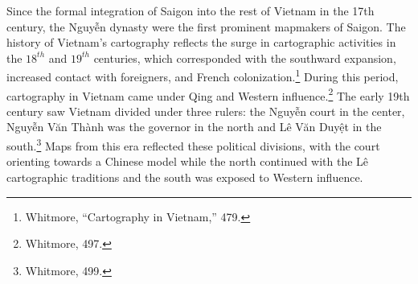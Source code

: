 \en
\begin{figure}[!ht]
\end{figure}

Since the formal integration of Saigon into the rest of Vietnam in the 17th century, the \vi Nguyễn dynasty were the first prominent mapmakers of Saigon. The history of Vietnam’s cartography reflects the surge in cartographic activities in the $18^{th}$ and $19^{th}$ centuries, which corresponded with the southward expansion, increased contact with foreigners, and French colonization.\footnote{Whitmore, “Cartography in Vietnam,” 479.} During this period, cartography in Vietnam came under Qing and Western influence.\footnote{Whitmore, 497.} The early 19th century saw Vietnam divided under three rulers: the Nguyễn court in the center, Nguyễn Văn Thành was the governor in the north and Lê Văn Duyệt in the south.\footnote{Whitmore, 499.} Maps from this era reflected these political divisions, with the court orienting towards a Chinese model while the north continued with the Lê cartographic traditions and the south was exposed to Western influence.

